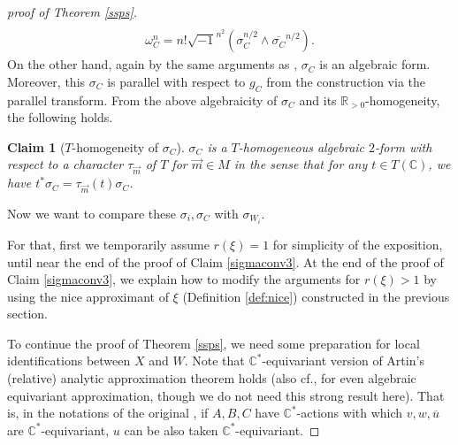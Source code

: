 \documentclass[12pt,a4paper]{amsart}
\newtheorem{Claim}[Thm]{Claim}
\theoremstyle{remark}
\theoremstyle{definition}
\def\R{\mathbb{R}}
\def\C{\mathbb{C}}
\begin{document}
\begin{proof}[proof of Theorem \ref{ssps}]
\begin{align}
\end{align}
\begin{align}\label{wedge}
\omega_C ^n=
n! \sqrt{-1}^{n^2}(\sigma_C^{n/2}\wedge  
\overline{\sigma_C}^{n/2}).
\end{align}
On the other hand, again by the same arguments as 
\cite[the proof of Lemma 2.17]{DSII}, 
$\sigma_C$ is an algebraic form. 
Moreover, 
this $\sigma_C$ is parallel with respect to $g_C$ from the 
construction via the parallel transform. 
From the above algebraicity of $\sigma_C$ and its $\R_{>0}$-homogeneity, 
the following holds. 
\begin{Claim}[$T$-homogeneity of $\sigma_C$]\label{sigmahomog}
$\sigma_C$ is a $T$-homogeneous algebraic $2$-form 
with respect to a character $\tau_{\vec{m}}$ of $T$ for $\vec{m}\in M$
in the sense that for any 
$t\in T(\C)$, we have $t^* \sigma_C=\tau_{\vec{m}}(t)\sigma_C$. 
\end{Claim}

Now we want to compare these $\sigma_i, \sigma_C$ with $\sigma_{W_i}$. 

For that, first we 
temporarily assume $r(\xi)=1$ for simplicity of the 
exposition, 
until near the end of the proof of Claim \ref{sigmaconv3}. 
At the end of the proof of Claim \ref{sigmaconv3}, 
we explain how to modify the arguments for $r(\xi)>1$ 
by using the nice approximant of $\xi$ (Definition \ref{def:nice}) 
constructed in the previous section. 

To continue the proof of Theorem \ref{ssps}, 
we need some preparation for local identifications between $X$ and $W$. 
Note that $\C^*$-equivariant version of Artin's (relative)  analytic 
approximation theorem holds (also cf., 
\cite[\S A.6]{AHR} for even algebraic equivariant 
approximation, though we do not need this strong result 
here). 
That is, in the notations of the original 
\cite[Theorem 1.5a (ii)]{Artin}, 
if $A, B, C$ have $\C^*$-actions 
with which $v,w,\overline{u}$ are $\C^*$-equivariant, $u$ can be 
also taken $\C^*$-equivariant. 


\end{proof}
\end{document}
